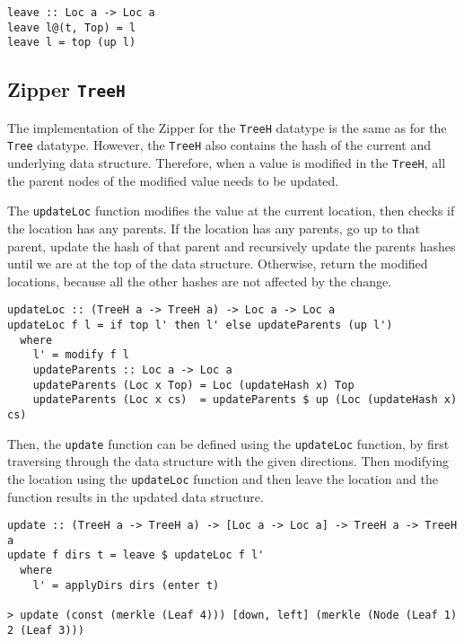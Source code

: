 \begin{verbatim}
leave :: Loc a -> Loc a
leave l@(t, Top) = l
leave l = top (up l)
\end{verbatim}

\subsection{Zipper \texttt{TreeH}}
\label{subsec-zipper-treeh}

The implementation of the Zipper for the \texttt{TreeH} datatype is the same as for the \texttt{Tree} datatype. However, the \texttt{TreeH} also contains the hash of the current and underlying data structure. Therefore, when a value is modified in the \texttt{TreeH}, all the parent nodes of the modified value needs to be updated. 

The \texttt{updateLoc} function modifies the value at the current location, then checks if the location has any parents. If the location has any parents, go up to that parent, update the hash of that parent and recursively update the parents hashes until we are at the top of the data structure. Otherwise, return the modified locations, because all the other hashes are not affected by the change. 

\begin{verbatim}
updateLoc :: (TreeH a -> TreeH a) -> Loc a -> Loc a
updateLoc f l = if top l' then l' else updateParents (up l')
  where
    l' = modify f l
    updateParents :: Loc a -> Loc a
    updateParents (Loc x Top) = Loc (updateHash x) Top
    updateParents (Loc x cs)  = updateParents $ up (Loc (updateHash x) cs)
\end{verbatim}

Then, the \texttt{update} function can be defined using the \texttt{updateLoc} function, by first traversing through the data structure with the given directions. Then modifying the location using the \texttt{updateLoc} function and then leave the location and the function results in the updated data structure.

\begin{verbatim}
update :: (TreeH a -> TreeH a) -> [Loc a -> Loc a] -> TreeH a -> TreeH a 
update f dirs t = leave $ updateLoc f l'
  where
    l' = applyDirs dirs (enter t)

> update (const (merkle (Leaf 4))) [down, left] (merkle (Node (Leaf 1) 2 (Leaf 3))) 
    
\end{verbatim}